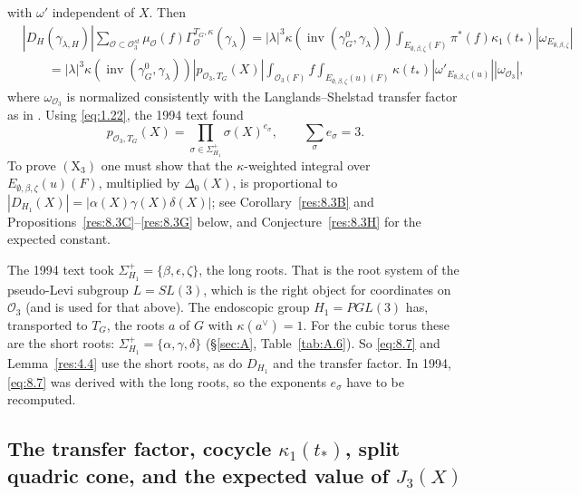 \documentclass[12pt,letterpaper]{amsart}
\theoremstyle{plain}
\theoremstyle{definition}
\theoremstyle{remark}
\theoremstyle{definition}
\DeclareMathOperator{\inv}{inv}
\begin{document}
with $\omega'$ independent of $X$. Then
\begin{equation}\tag{8.6}\label{eq:8.6}
\begin{split}
&|D_H(\gamma_{\lambda,H})|\sum_{{\mathcal O}\subset {\mathcal O}_3^{st}}
\mu_{\mathcal O}(f)\Gamma_{\mathcal O}^{T_G,\kappa}(\gamma_\lambda)
=|\lambda|^3\kappa(\inv(\gamma_G^0,\gamma_\lambda))
\int_{E_{\emptyset,\beta,\zeta}(F)}
\pi^*(f)\kappa_1(t_*)|\omega_{E_{\emptyset,\beta,\zeta}}|\\
&\qquad=|\lambda|^3\kappa(\inv(\gamma_G^0,\gamma_\lambda))
|p_{{\mathcal O}_3,T_G}(X)|
\int_{{\mathcal O}_3(F)}f
\int_{E_{\emptyset,\beta,\zeta}(u)(F)}\kappa(t_*)
|\omega'_{E_{\emptyset,\beta,\zeta}(u)}||\omega_{\mathcal O_3}|,
\end{split}
\end{equation}
where $\omega_{{\mathcal O}_3}$ is normalized consistently with the
Langlands--Shelstad transfer factor as in \cite{Ha89}.
Using \eqref{eq:1.22}, the 1994 text found
\begin{equation}\tag{8.7}\label{eq:8.7}
p_{{\mathcal O}_3,T_G}(X)=\prod_{\sigma \in\Sigma_{H_1}^+}\sigma(X)^{e_\sigma},
\qquad \sum_{\sigma}e_\sigma=3 .
\end{equation}
To prove $(\mathrm X_3)$ one must show that the $\kappa$-weighted integral over
$E_{\emptyset,\beta,\zeta}(u)(F)$, multiplied by $\Delta_0(X)$, is proportional
to $|D_{H_1}(X)|=|\alpha(X)\gamma(X)\delta(X)|$; see
Corollary~\ref{res:8.3B} and Propositions~\ref{res:8.3C}--\ref{res:8.3G} below,
and Conjecture~\ref{res:8.3H} for the expected constant.

\begin{rem26}\label{rem:8.roots}
The 1994 text took $\Sigma_{H_1}^+=\{\beta,\epsilon,\zeta\}$, the long
roots. That is the root system of the pseudo-Levi subgroup $L=SL(3)$, which
is the right object for coordinates on $\mathcal O_3$ (and is used for that
above). The endoscopic group $H_1=PGL(3)$ has, transported to $T_G$, the
roots $a$ of $G$ with $\kappa(a^\vee)=1$. For the cubic torus these are the
short roots: $\Sigma_{H_1}^+=\{\alpha,\gamma,\delta\}$
(\S\ref{sec:A}, Table~\ref{tab:A.6}). So \eqref{eq:8.7} and
Lemma~\ref{res:4.4} use the short roots, as do $D_{H_1}$ and the transfer
factor. In 1994, \eqref{eq:8.7} was derived with the long roots, so the
exponents $e_\sigma$ have to be recomputed.
\end{rem26}

\subsection*{The transfer factor, cocycle \texorpdfstring{$\kappa_1(t_*)$}{kappa1(t*)}, split quadric cone, and the expected value of \texorpdfstring{$J_3(X)$}{J3(X)}}
\end{document}
